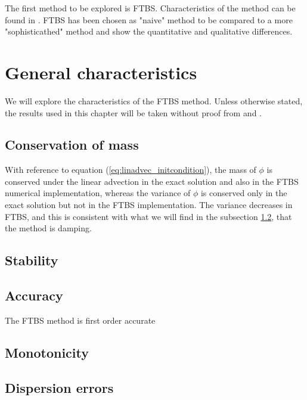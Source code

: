 

The first method to be explored is FTBS. Characteristics of the method can be found in \cite{mpebook}.
FTBS has been chosen as "naive" method to be compared to a more "sophisticathed" method and show the quantitative and qualitative differences.

\section{General characteristics}
We will explore the characteristics of the FTBS method. Unless otherwise stated, the results used in this chapter will be taken without proof from \cite{mpebook} and \cite{nmnotes}.

\subsection{Conservation of mass} \label{conservationftbs}
With reference to equation (\ref{eq:linadvec_initcondition}), the mass of $\phi$ is conserved under the linear advection in the exact solution and also in the FTBS numerical implementation, whereas the variance of $\phi$ is conserved only in the exact solution but not in the FTBS implementation. The variance decreases in FTBS, and this is consistent with what we will find in the subsection \ref{stabilityftbs}, that the method is damping.

\subsection{Stability} \label{stabilityftbs}


\subsection{Accuracy}
The FTBS method is first order accurate

\subsection{Monotonicity}

\subsection{Dispersion errors}

